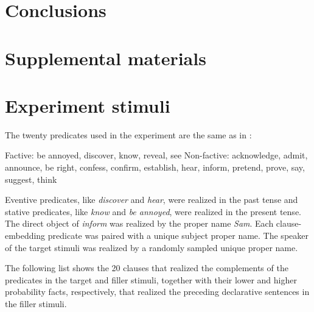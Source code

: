 \documentclass[11pt,fleqn]{article}
\newcommand{\6}{\mbox{$[\hspace*{-.6mm}[$}}
\newcommand{\9}{\mbox{$]\hspace*{-.6mm}]$}}
\begin{document}
\section{Conclusions}\label{s4}



%


\newpage

\section*{Supplemental materials}

\appendix

\setcounter{page}{1}

\setcounter{table}{0}
\renewcommand{\thetable}{A\arabic{table}}

\setcounter{figure}{0}
\renewcommand{\thefigure}{A\arabic{figure}}

\section{Experiment stimuli}\label{a:clauses}

The twenty predicates used in the experiment are the same as in \citealt{degen-tonhauser-openmind,degen-tonhauser-language}:

\begin{exe}
\ex\label{predicates}
\begin{xlist}
\ex Factive: be annoyed, discover, know, reveal, see
\ex Non-factive: acknowledge, admit, announce, be right, confess, confirm, establish, hear, inform, pretend, prove, say, suggest, think
\end{xlist}
\end{exe}

Eventive predicates, like {\em discover} and {\em hear}, were realized in the past tense and stative predicates, like {\em know} and {\em be annoyed}, were realized in the present tense. The direct object of {\em inform} was realized by the proper name {\em Sam}. Each clause-embedding predicate was paired with a unique subject proper name. The speaker of the target stimuli was realized by a randomly sampled unique proper name. 

The following list shows the 20 clauses that realized the complements of the predicates in the target and filler stimuli, together with their lower and higher probability facts, respectively, that realized the preceding declarative sentences in the filler stimuli.
\end{document}
